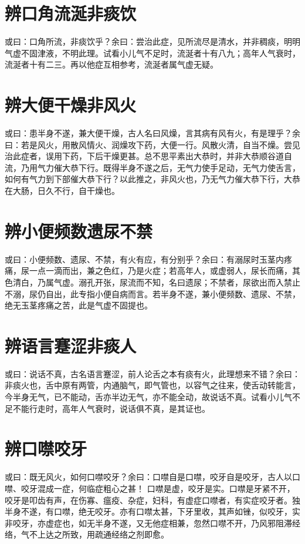 \documentclass[a4paper,12pt,UTF8,twoside]{ctexbook}
\begin{document}
	\section{辨口角流涎非痰饮}
	或曰：口角所流，非痰饮乎？余曰：尝治此症，见所流尽是清水，并非稠痰，明明气虚不固津液，不明此理。试看小儿气不足时，流涎者十有八九；高年人气衰时，流涎者十有二三。再以他症互相参考，流涎者属气虚无疑。
	\section{辨大便干燥非风火}
	或曰：患半身不遂，兼大便干燥，古人名曰风燥，言其病有风有火，有是理乎？余曰：若是风火，用散风情火、润燥攻下药，大便一行。风散火清，自当不燥。尝见治此症者，误用下药，下后干燥更甚。总不思平素出大恭时，并非大恭顺谷道自流，乃用气力催大恭下行。既得半身不遂之后，无气力使手足动，无气力使舌言，如何有气力到下部催大恭下行？以此推之，非风火也，乃无气力催大恭下行，大恭在大肠，日久不行，自干燥也。
	\section{辨小便频数遗尿不禁}
	或曰：小便频数、遗尿、不禁，有火有应，有分别乎？余曰：有溺尿时玉茎内疼痛，尿一点一滴而出，兼之色红，乃是火症；若高年人，或虚弱人，尿长而痛，其色清白，乃属气虚。溺孔开张，尿流而不知，名曰遗尿；不禁者，尿欲出而入禁止不溺，尿仍自出，此专指小便自病而言。若半身不遂，兼小便频数、遗尿、不禁，绝无玉茎疼痛之苦，此是气虚不固提也。
	\section{辨语言蹇涩非痰人}
	或曰：说话不真，古名语言蹇涩，前人论舌之本有痰有火，此理想来不错？余曰：非痰火也，舌中原有两管，内通脑气，即气管也，以容气之往来，使舌动转能言，今半身无气，已不能动，舌亦半边无气，亦不能全动，故说话不真。试看小儿气不足不能行走时，高年人气衰时，说话俱不真，是其证也。
	\section{辨口噤咬牙}
	或曰：既无风火，如何口噤咬牙？余曰：口噤自是口噤，咬牙自是咬牙，古人以口噤、咬牙混成一症，何临症粗心之甚！ 口噤是虚，咬牙是实。口噤是牙紧不开，咬牙是叩齿有声，在伤寡、瘟疫、杂症，妇科，有虚症口噤者，有实症咬牙者。独半身不遂，有口噤，绝无咬牙。亦有口噤太甚，下牙里收，其声如锉，似咬牙，实非咬牙，亦虚症也，如无半身不遂，又无他症相兼，忽然口噤不开，乃风邪阻滞经络，气不上达之所致，用疏通经络之剂即愈。
\end{document}
